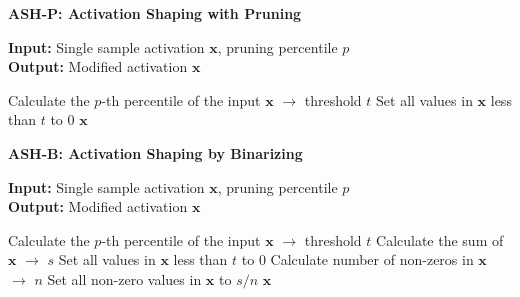 \documentclass{article}
\newcommand{\alglabel}[1]{\label{alg:#1}}
\begin{document}
\begin{minipage}{0.3\textwidth}
    \begin{algorithm}[H]
    \small
    	\caption{\textbf{\textcolor{ashpcolor}{ASH-P: Activation Shaping with Pruning}}}
\textbf{Input:} Single sample activation $\mathbf{x}$, pruning percentile $p$\\
        \textbf{Output:} Modified activation $\mathbf{x}$\\
        \begin{algorithmic}[1]
            \STATE Calculate the $p$-th percentile of the input $\mathbf{x}$ $\rightarrow$ threshold $t$
            \vspace{0.35cm}
            \STATE Set all values in $\mathbf{x}$ less than $t$ to $0$
          	\vspace{1.05cm}
            \RETURN $\mathbf{x}$
        \end{algorithmic}
    	\alglabel{ash-p}
    \end{algorithm} 
\end{minipage}
\hfill
\begin{minipage}{0.34\textwidth}
    \begin{algorithm}[H]
    \small
    	\caption{\textbf{\textcolor{ashbcolor}{ASH-B: Activation Shaping by Binarizing}}}
\textbf{Input:} Single sample activation $\mathbf{x}$, pruning percentile $p$\\
        \textbf{Output:} Modified activation $\mathbf{x}$\\
        \begin{algorithmic}[1]
            \STATE Calculate the $p$-th percentile of the input $\mathbf{x}$ $\rightarrow$ threshold $t$
            \STATE Calculate the sum of $\mathbf{x}$ $\rightarrow$ $s$
            \STATE Set all values in $\mathbf{x}$ less than $t$ to $0$
            \STATE Calculate number of non-zeros in $\mathbf{x}$ $\rightarrow$ $n$
            \STATE Set all non-zero values in $\mathbf{x}$ to $s/n$
            \RETURN $\mathbf{x}$
        \end{algorithmic}
    	\alglabel{ash-b}
    \end{algorithm} 
\end{minipage}
\hfill
\end{document}
